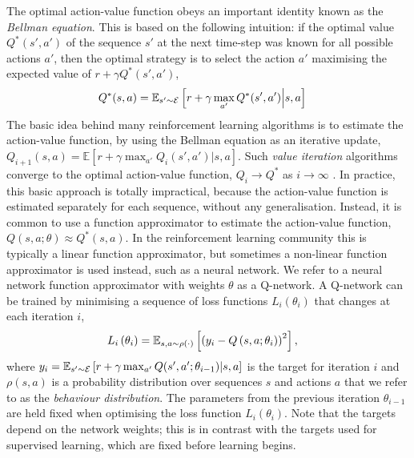 The optimal action-value function obeys an important identity known as the \emph{Bellman equation}. This is based on the following intuition: if the optimal value $Q^*(s',a')$ of the sequence $s'$ at the next time-step was known for all possible actions $a'$, then the optimal strategy is to select the action $a'$ maximising the expected value of $r + \gamma Q^*(s',a')$,
%
\begin{align}
Q^*(s,a) &= \mathbb{E}_{s' \sim \mathcal{E}} \left[  r + \gamma \max_{a'} Q^*(s', a') \Big| s, a  \right]
\end{align}
%
The basic idea behind many reinforcement learning algorithms is to estimate the action-value function, by using the Bellman equation as an iterative update, $Q_{i+1}(s,a) = \mathbb{E}\left[ r + \gamma \max_{a'} Q_i(s', a') | s, a \right]$. Such \emph{value iteration} algorithms converge to the optimal action-value function, $Q_i \rightarrow Q^*$ as $i \rightarrow \infty$ \cite{sutton:book}. In practice, this basic approach is totally impractical, because the action-value function is estimated separately for each sequence, without any generalisation. Instead, it is common to use a function approximator to estimate the action-value function, $Q(s,a; \theta) \approx Q^*(s,a)$. In the reinforcement learning community this is typically a linear function approximator, but sometimes a non-linear function approximator is used instead, such as a neural network. We refer to a neural network function approximator with weights $\theta$ as a Q-network. A Q-network can be trained by minimising a sequence of loss functions $L_i(\theta_i)$ that changes at each iteration $i$,
%
\begin{align}
L_i\left(\theta_i\right) &= \mathbb{E}_{s,a \sim \rho(\cdot)} \left[ \left(y_i - Q \left(s,a ; \theta_i \right) \right)^2 \right],
\label{eq:q-learning-loss}
\end{align}
%
where $y_i = \mathbb{E}_{s' \sim \mathcal{E}} \left[ r + \gamma \max_{a'} Q(s', a'; \theta_{i-1}) | s, a  \right]$ is the target for iteration $i$ and $\rho(s,a)$ is a probability distribution over sequences $s$ and actions $a$ that we refer to as the \emph{behaviour distribution}. The parameters from the previous iteration $\theta_{i-1}$ are held fixed when optimising the loss function $L_i\left(\theta_i\right)$. 
Note that the targets depend on the network weights; this is in contrast with the targets used for supervised learning, which are fixed before learning begins.
